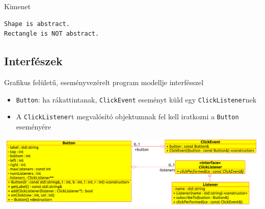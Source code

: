 \begin{frame}[fragile]
    \begin{exampleblock}{}
        \footnotesize
        \vspace{-.3cm}
        
        \vspace{-.3cm}
    \end{exampleblock}
    \begin{block}{Kimenet}
        \footnotesize
        \vspace{-.3cm}
        \begin{verbatim}
Shape is abstract.
Rectangle is NOT abstract.
        \end{verbatim}
        \vspace{-.6cm}
    \end{block}
\end{frame}

\subsection{Interfészek}

\begin{frame}
    Grafikus felületű, eseményvezérelt program modellje  interfésszel
    \begin{itemize}
        \item \texttt{Button}: ha rákattintanak, \texttt{ClickEvent} eseményt küld egy \texttt{ClickListener}nek
        \item A \texttt{ClickListener}t megvalósító objektumnak fel kell iratkozni a \texttt{Button} eseményére
    \end{itemize}
    \begin{center}
        \includegraphics[scale=0.54]{interface.eps}
    \end{center}
\end{frame}

